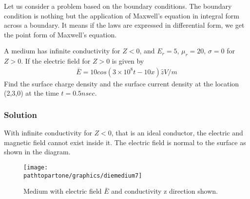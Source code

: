 Let us consider a problem based on the boundary conditions. The boundary condition is nothing but the application of Maxwell's equation in integral form across a boundary. It means if the laws are expressed in differential form, we get the point form of Maxwell's equation.
\begin{exmp}
A medium has infinite conductivity for $Z<0$, and $E_r=5$, $\mu_r = 20$, $\sigma = 0$ for $Z>0$. If the electric field for $Z>0$ is given by 
\begin{align*}
\bar{E} = 10cos(3\times 10^8t - 10x)\hat{z}  V/m
\end{align*}
Find the surface charge density and the surface current density at the location (2,3,0) at the time $t = 0.5nsec$.\\
\subsubsection*{Solution}
With infinite conductivity for $Z<0$, that is an ideal conductor, the electric and magnetic field cannot exist inside it. The electric field is normal to the surface as shown in the diagram.
\begin{figure}[h]
\centering
\texttt{[image: \\pathtopartone/graphics/diemedium7]}
\caption{Medium with electric field $\bar{E}$ and conductivity z direction shown.}
\end{figure}


\end{exmp}
